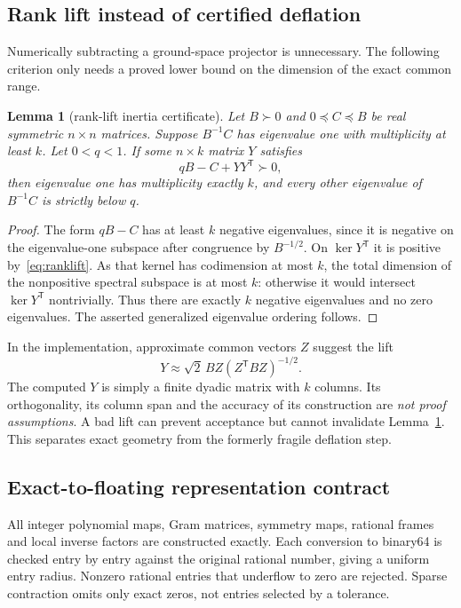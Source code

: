 \documentclass[11pt,a4paper]{article}
\newtheorem{lemma}[theorem]{Lemma}\newtheorem{proposition}[theorem]{Proposition}
\theoremstyle{remark}\newtheorem{remark}[theorem]{Remark}
\begin{document}
\subsection{Rank lift instead of certified deflation}
Numerically subtracting a ground-space projector is unnecessary. The following criterion only needs a proved lower bound on the dimension of the exact common range.
\begin{lemma}[rank-lift inertia certificate]\label{lem:ranklift}
Let $B\succ0$ and $0\preceq C\preceq B$ be real symmetric $n\times n$ matrices. Suppose $B^{-1}C$ has eigenvalue one with multiplicity at least $k$. Let $0<q<1$. If some $n\times k$ matrix $Y$ satisfies
\begin{equation}\label{eq:ranklift}
 qB-C+YY^{\mathsf T}\succ0,
\end{equation}
then eigenvalue one has multiplicity exactly $k$, and every other eigenvalue of $B^{-1}C$ is strictly below $q$.
\end{lemma}
\begin{proof}
The form $qB-C$ has at least $k$ negative eigenvalues, since it is negative on the eigenvalue-one subspace after congruence by $B^{-1/2}$. On $\ker Y^{\mathsf T}$ it is positive by~\eqref{eq:ranklift}. As that kernel has codimension at most $k$, the total dimension of the nonpositive spectral subspace is at most $k$: otherwise it would intersect $\ker Y^{\mathsf T}$ nontrivially. Thus there are exactly $k$ negative eigenvalues and no zero eigenvalues. The asserted generalized eigenvalue ordering follows.
\end{proof}

In the implementation, approximate common vectors $Z$ suggest the lift
\[
 Y\approx\sqrt2\,BZ(Z^{\mathsf T}BZ)^{-1/2}.
\]
The computed $Y$ is simply a finite dyadic matrix with $k$ columns. Its orthogonality, its column span and the accuracy of its construction are \emph{not proof assumptions}. A bad lift can prevent acceptance but cannot invalidate Lemma~\ref{lem:ranklift}. This separates exact geometry from the formerly fragile deflation step.

\subsection{Exact-to-floating representation contract}
All integer polynomial maps, Gram matrices, symmetry maps, rational frames and local inverse factors are constructed exactly. Each conversion to binary64 is checked entry by entry against the original rational number, giving a uniform entry radius. Nonzero rational entries that underflow to zero are rejected. Sparse contraction omits only exact zeros, not entries selected by a tolerance.
\end{document}
